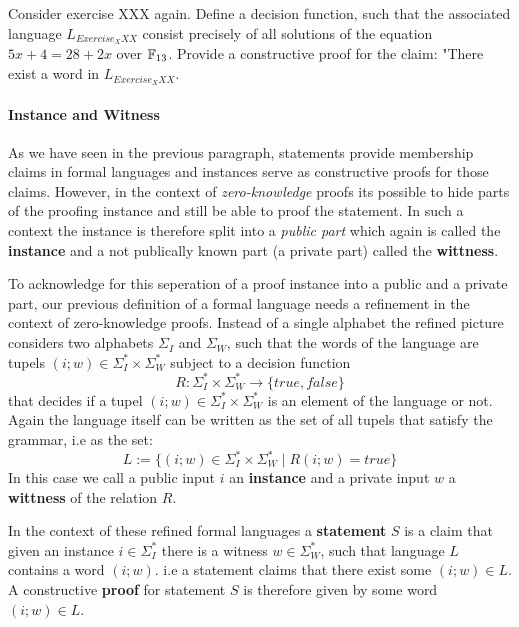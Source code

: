 \begin{exercise} Consider exercise XXX again. Define a decision function, such that the associated language $L_{Exercise_XXX}$ consist precisely of all solutions of the equation $5x + 4 = 28 + 2x$ over $\mathbb{F}_{13}$. Provide a constructive proof for the claim: "There exist a word in $L_{Exercise_XXX}$. 
\end{exercise}
\paragraph{Instance and Witness}
As we have seen in the previous paragraph, statements provide membership claims in formal languages and instances serve as constructive proofs for those claims. However, in the context of \textit{zero-knowledge} proofs  its possible to hide parts of the proofing instance and still be able to proof the statement. In such a context the instance is therefore split into a \textit{public part} which again is called the \textbf{instance} and a not publically known part (a private part) called the \textbf{wittness}.

To acknowledge for this seperation of a proof instance into a public and a private part, our previous definition of a formal language needs a refinement in the context of zero-knowledge proofs. Instead of a single alphabet the refined picture considers two alphabets $\Sigma_I$ and $\Sigma_W$, such that the words of the language are tupels $(i;w)\in \Sigma_I^* \times \Sigma_W^*$ subject to a decision function
\begin{equation}
R: \Sigma_I^* \times \Sigma_W^* \to \{true, false\}
\end{equation}
that decides if a tupel $(i;w)\in \Sigma_I^* \times \Sigma_W^*$ is an element of the language or not. Again the language itself can be written as the set of all tupels that satisfy the grammar, i.e as the set:
\begin{equation}
L := \{(i;w)\in \Sigma_I^* \times \Sigma_W^* \;|\; R(i;w)=true\}
\end{equation}
In this case we call a public input $i$ an \textbf{instance} and a private input $w$ a \textbf{wittness} of the relation $R$. 

In the context of these refined formal languages a \textbf{statement} $S$ is a claim that given an instance $i\in\Sigma_I^*$ there is a witness $w\in \Sigma_W^*$, such that language $L$ contains a word $(i;w)$. i.e a statement claims that there exist some $(i;w)\in L$. A constructive \textbf{proof} for statement $S$ is therefore given by some word $(i;w)\in L$. 

